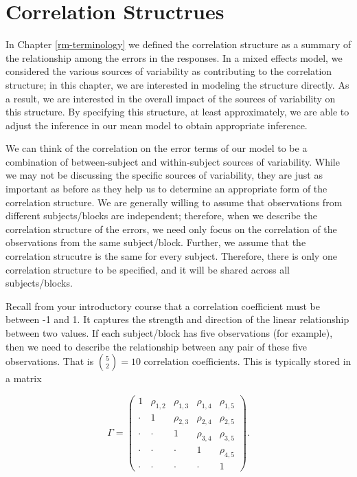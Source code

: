 \documentclass[
]{book}
\theoremstyle{plain}
\theoremstyle{mydefn}
\theoremstyle{myexmpl}
\theoremstyle{remark}
\begin{document}
\hypertarget{correlation-structrues}{%
\section{Correlation Structrues}\label{correlation-structrues}}

In Chapter \ref{rm-terminology} we defined the correlation structure as a summary of the relationship among the errors in the responses. In a mixed effects model, we considered the various sources of variability as contributing to the correlation structure; in this chapter, we are interested in modeling the structure directly. As a result, we are interested in the overall impact of the sources of variability on this structure. By specifying this structure, at least approximately, we are able to adjust the inference in our mean model to obtain appropriate inference.

We can think of the correlation on the error terms of our model to be a combination of between-subject and within-subject sources of variability. While we may not be discussing the specific sources of variability, they are just as important as before as they help us to determine an appropriate form of the correlation structure. We are generally willing to assume that observations from different subjects/blocks are independent; therefore, when we describe the correlation structure of the errors, we need only focus on the correlation of the observations from the same subject/block. Further, we assume that the correlation strucutre is the same for every subject. Therefore, there is only one correlation structure to be specified, and it will be shared across all subjects/blocks.

Recall from your introductory course that a correlation coefficient must be between -1 and 1. It captures the strength and direction of the linear relationship between two values. If each subject/block has five observations (for example), then we need to describe the relationship between any pair of these five observations. That is \(\binom{5}{2} = 10\) correlation coefficients. This is typically stored in a matrix

\[\Gamma = \begin{pmatrix} 
1 & \rho_{1,2} & \rho_{1,3} & \rho_{1,4} & \rho_{1,5} \\
\cdot & 1 & \rho_{2,3} & \rho_{2,4} & \rho_{2,5} \\
\cdot & \cdot & 1 & \rho_{3,4} & \rho_{3,5} \\
\cdot & \cdot & \cdot & 1 & \rho_{4,5} \\
\cdot & \cdot & \cdot & \cdot & 1 \end{pmatrix}.\]
\end{document}
